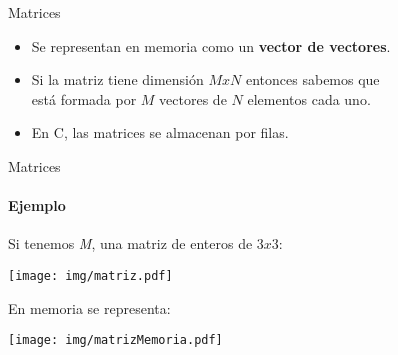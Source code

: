 \documentclass[aspectratio=169]{beamer}
\begin{document}
\begin{frame}[fragile]{Matrices}
    \begin{itemize}
    \setlength\itemsep{0.5cm}
    \large
    \item Se representan en memoria como un \textbf{vector de vectores}.
    \pause
    \item Si la matriz tiene dimensión $M x N$ entonces sabemos que\\ está formada por $M$ vectores de $N$ elementos cada uno.
    \pause
    \item En C, las matrices se almacenan por filas.
    \end{itemize}
\end{frame}    
    
\begin{frame}[fragile]{Matrices}
    \framesubtitle{Ejemplo}
    Si tenemos \textit{M}, una matriz de enteros de $3 x 3$:
    \vskip 15pt
    \begin{center}
    \texttt{[image: img/matriz.pdf]}
    \end{center}
    \vskip 15pt
    \pause
    En memoria se representa:
    \vskip 5pt
    \begin{center}
    \texttt{[image: img/matrizMemoria.pdf]}
    \end{center}
\end{frame}        
\end{document}
